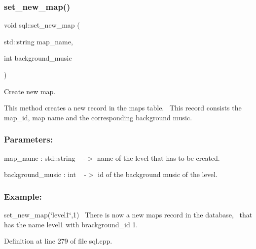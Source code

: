 \subsubsection{\texorpdfstring{set\+\_\+new\+\_\+map()}{set\_new\_map()}}
{\footnotesize\ttfamily void sql\+::set\+\_\+new\+\_\+map (\begin{DoxyParamCaption}\item[{std\+::string}]{map\+\_\+name,  }\item[{int}]{background\+\_\+music }\end{DoxyParamCaption})}



Create new map. 

This method creates a new record in the maps table.~\newline
This record consists the map\+\_\+id, map name and the corresponding background music.~\newline


\subsubsection*{Parameters\+: }

map\+\_\+name \+: std\+::string ~\newline
-\/$>$ name of the level that has to be created.

background\+\_\+music \+: int ~\newline
-\/$>$ id of the background music of the level.

\subsubsection*{Example\+: }

set\+\_\+new\+\_\+map(\char`\"{}level1\char`\"{},1)~\newline
There is now a new maps record in the database,~\newline
that has the name level1 with brackground\+\_\+id 1.~\newline


Definition at line 279 of file sql.\+cpp.

